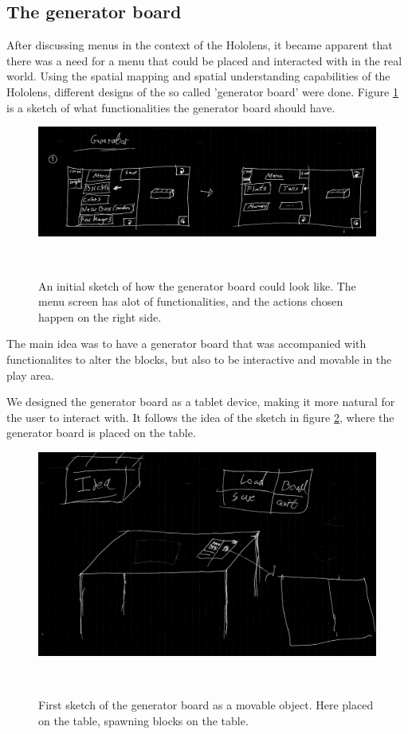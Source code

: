 \subsection{The generator board}
After discussing menus in the context of the Hololens, it became apparent that there was a need for a menu that could be placed and interacted with in the real world. Using the spatial mapping and spatial understanding capabilities of the Hololens, different designs of the so called 'generator board' were done. Figure \ref{fig:genboard1} is a sketch of what functionalities the generator board should have.
\begin{figure}[h]
	\centering
	\includegraphics[width=0.7\columnwidth]{figures/Generator/gen5.png}
	\caption{An initial sketch of how the generator board could look like. The menu screen has alot of functionalities, and the actions chosen happen on the right side.}~\label{fig:genboard1}
\end{figure}
The main idea was to have a generator board that was accompanied with functionalites to alter the blocks, but also to be interactive and movable in the play area.\par
We designed the generator board as a tablet device, making it more natural for the user to interact with. It follows the idea of the sketch in figure \ref{fig:gentablet}, where the generator board is placed on the table.
\begin{figure}[h]
	\centering
	\includegraphics[width=0.7\columnwidth]{figures/Generator/gen6.png}
	\caption{First sketch of the generator board as a movable object. Here placed on the table, spawning blocks on the table.}~\label{fig:gentablet}
\end{figure}
